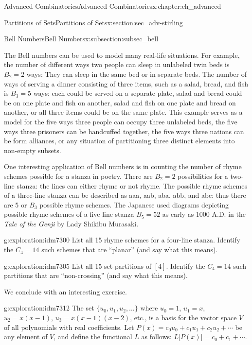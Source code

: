 \documentclass[oneside,10pt,]{book}
\numberwithin{equation}{chapter}
\begin{document}
\begin{chapterptx}{Advanced Combinatorics}{}{Advanced Combinatorics}{}{}{x:chapter:ch_advanced}
\begin{sectionptx}{Partitions of Sets}{}{Partitions of Sets}{}{}{x:section:sec_adv-stirling}
\begin{subsectionptx}{Bell Numbers}{}{Bell Numbers}{}{}{x:subsection:subsec_bell}
\par
The Bell numbers can be used to model many real-life situations. For example, the number of different ways two people can sleep in unlabeled twin beds is \(B_{2} = 2\) ways: They can sleep in the same bed or in separate beds. The number of ways of serving a dinner consisting of three items, such as a salad, bread, and fish is \(B_{3} = 5\) ways: each could be served on a separate plate, salad and bread could be on one plate and fish on another, salad and fish on one plate and bread on another, or all three items could be on the same plate. This example serves as a model for the five ways three people can occupy three unlabeled beds, the five ways three prisoners can be handcuffed together, the five ways three nations can be form alliances, or any situation of partitioning three distinct elements into non-empty subsets.%
\par
One interesting application of Bell numbers is in counting the number of rhyme schemes possible for a stanza in poetry. There are \(B_{2} = 2\) possibilities for a two-line stanza: the lines can either rhyme or not rhyme. The possible rhyme schemes of a three-line stanza can be described as aaa, aab, aba, abb, and abc: thus there are 5 or \(B_{3}\) possible rhyme schemes. The Japanese used diagrams depicting possible rhyme schemes of a five-line stanza \(B_{5} = 52\) as early as 1000 A.D. in the \emph{Tale of the Genji} by Lady Shikibu Murasaki.%
\begin{exploration}{}{g:exploration:idm7300}%
List all 15 rhyme schemes for a four-line stanza.  Identify the \(C_4 = 14\) such schemes that are ``planar'' (and say what this means).%
\end{exploration}
\begin{exploration}{}{g:exploration:idm7305}%
List all 15 set partitions of \([4]\).  Identify the \(C_4 = 14\) such partitions that are ``non-crossing'' (and say what this means).%
\end{exploration}
We conclude with an interesting exercise.%
\begin{exploration}{}{g:exploration:idm7312}%
The set \(\{u_{0}, u_{1}, u_{2}, \ldots \}\) where \(u_{0} = 1\), \(u_{1} = x\), \(u_{2} = x(x - 1)\), \(u_{3} = x(x - 1)(x - 2)\), etc., is a basis for the vector space \(V\) of all polynomials with real coefficients. Let \(P(x) = c_{0}u_{0} + c_{1}u_{1} + c_{2}u_{2} + \cdots\) be any element of \(V\), and define the functional \(L\) as follows: \(L\lbrack P(x)\rbrack = c_{0} + c_{1} + \cdots\).%
\par

\end{exploration}
\end{subsectionptx}
\end{sectionptx}
\end{chapterptx}
\end{document}

